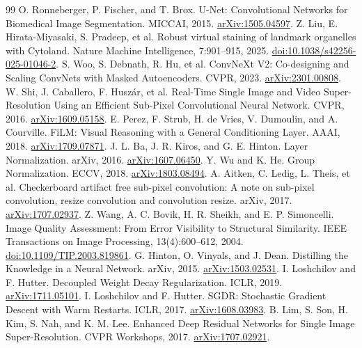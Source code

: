 \documentclass[UTF8,a4paper,zihao=5,fontset=fandol]{ctexart}
\begin{document}
\begin{thebibliography}{99}\small
\setlength{\itemsep}{1pt}
 O. Ronneberger, P. Fischer, and T. Brox. U-Net: Convolutional Networks for Biomedical Image Segmentation. MICCAI, 2015. \href{https://arxiv.org/abs/1505.04597}{arXiv:1505.04597}.
 Z. Liu, E. Hirata-Miyasaki, S. Pradeep, et al. Robust virtual staining of landmark organelles with Cytoland. Nature Machine Intelligence, 7:901--915, 2025. \href{https://doi.org/10.1038/s42256-025-01046-2}{doi:10.1038/s42256-025-01046-2}.
 S. Woo, S. Debnath, R. Hu, et al. ConvNeXt V2: Co-designing and Scaling ConvNets with Masked Autoencoders. CVPR, 2023. \href{https://arxiv.org/abs/2301.00808}{arXiv:2301.00808}.
 W. Shi, J. Caballero, F. Husz\'ar, et al. Real-Time Single Image and Video Super-Resolution Using an Efficient Sub-Pixel Convolutional Neural Network. CVPR, 2016. \href{https://arxiv.org/abs/1609.05158}{arXiv:1609.05158}.
 E. Perez, F. Strub, H. de Vries, V. Dumoulin, and A. Courville. FiLM: Visual Reasoning with a General Conditioning Layer. AAAI, 2018. \href{https://arxiv.org/abs/1709.07871}{arXiv:1709.07871}.
 J. L. Ba, J. R. Kiros, and G. E. Hinton. Layer Normalization. arXiv, 2016. \href{https://arxiv.org/abs/1607.06450}{arXiv:1607.06450}.
 Y. Wu and K. He. Group Normalization. ECCV, 2018. \href{https://arxiv.org/abs/1803.08494}{arXiv:1803.08494}.
 A. Aitken, C. Ledig, L. Theis, et al. Checkerboard artifact free sub-pixel convolution: A note on sub-pixel convolution, resize convolution and convolution resize. arXiv, 2017. \href{https://arxiv.org/abs/1707.02937}{arXiv:1707.02937}.
 Z. Wang, A. C. Bovik, H. R. Sheikh, and E. P. Simoncelli. Image Quality Assessment: From Error Visibility to Structural Similarity. IEEE Transactions on Image Processing, 13(4):600--612, 2004. \href{https://doi.org/10.1109/TIP.2003.819861}{doi:10.1109/TIP.2003.819861}.
 G. Hinton, O. Vinyals, and J. Dean. Distilling the Knowledge in a Neural Network. arXiv, 2015. \href{https://arxiv.org/abs/1503.02531}{arXiv:1503.02531}.
 I. Loshchilov and F. Hutter. Decoupled Weight Decay Regularization. ICLR, 2019. \href{https://arxiv.org/abs/1711.05101}{arXiv:1711.05101}.
 I. Loshchilov and F. Hutter. SGDR: Stochastic Gradient Descent with Warm Restarts. ICLR, 2017. \href{https://arxiv.org/abs/1608.03983}{arXiv:1608.03983}.
 B. Lim, S. Son, H. Kim, S. Nah, and K. M. Lee. Enhanced Deep Residual Networks for Single Image Super-Resolution. CVPR Workshops, 2017. \href{https://arxiv.org/abs/1707.02921}{arXiv:1707.02921}.
\end{thebibliography}
\end{document}
